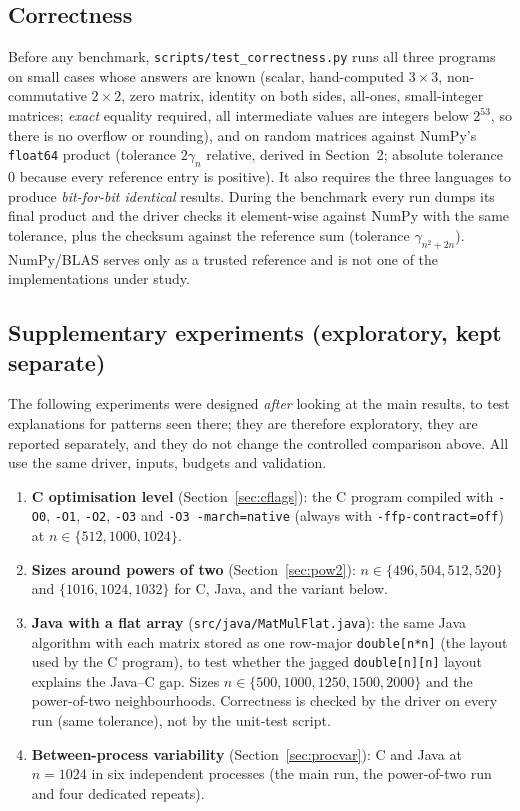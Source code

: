\subsection{Correctness}
\label{sec:correct}
Before any benchmark, \texttt{scripts/test\_correctness.py} runs all three programs on small cases whose answers are
known (scalar, hand-computed $3\times3$, non-commutative $2\times2$, zero matrix, identity on both sides,
all-ones, small-integer matrices; \emph{exact} equality required, all intermediate values are integers below $2^{53}$,
so there is no overflow or rounding), and on random matrices against NumPy's \texttt{float64} product (tolerance
$2\gamma_n$ relative, derived in Section~2; absolute tolerance $0$ because every reference entry is positive). It also
requires the three languages to produce \emph{bit-for-bit identical} results. During the benchmark every run dumps
its final product and the driver checks it element-wise against NumPy with the same tolerance, plus the checksum
against the reference sum (tolerance $\gamma_{n^2+2n}$). NumPy/BLAS serves only as a trusted reference and is
not one of the implementations under study.

\subsection{Supplementary experiments (exploratory, kept separate)}
\label{sec:supp}
The following experiments were designed \emph{after} looking at the main results, to test explanations for
patterns seen there; they are therefore exploratory, they are reported separately, and they do not change the
controlled comparison above. All use the same driver, inputs, budgets and validation.
\begin{enumerate}
  \item \textbf{C optimisation level} (Section~\ref{sec:cflags}): the C program compiled with \texttt{-O0}, \texttt{-O1},
        \texttt{-O2}, \texttt{-O3} and \texttt{-O3 -march=native} (always with \texttt{-ffp-contract=off}) at
        $n\in\{512,1000,1024\}$.
  \item \textbf{Sizes around powers of two} (Section~\ref{sec:pow2}): $n\in\{496,504,512,520\}$ and
        $\{1016,1024,1032\}$ for C, Java, and the variant below.
  \item \textbf{Java with a flat array} (\texttt{src/java/MatMulFlat.java}): the same Java algorithm with each matrix
        stored as one row-major \texttt{double[n*n]} (the layout used by the C program), to test whether the
        jagged \texttt{double[n][n]} layout explains the Java--C gap. Sizes $n\in\{500,1000,1250,1500,2000\}$ and the
        power-of-two neighbourhoods. Correctness is checked by the driver on every run (same tolerance), not by
        the unit-test script.
  \item \textbf{Between-process variability} (Section~\ref{sec:procvar}): C and Java at $n=1024$ in six
        independent processes (the main run, the power-of-two run and four dedicated repeats).
\end{enumerate}
